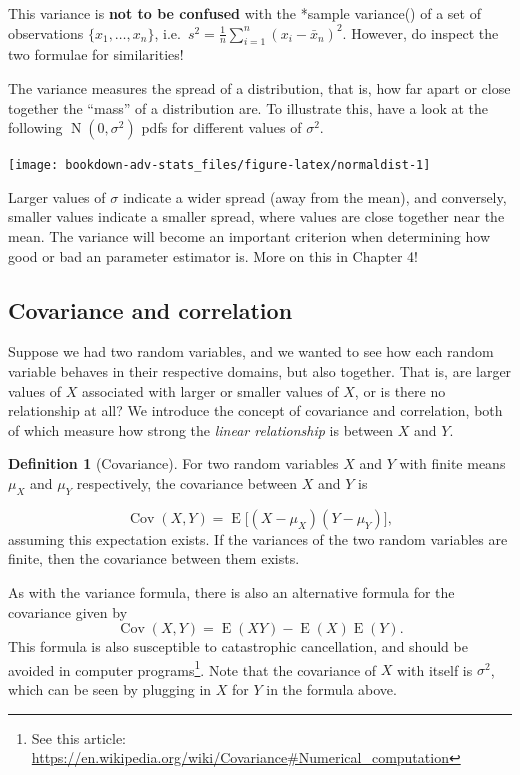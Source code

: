 \documentclass[
]{book}
\DeclareMathOperator{\E}{E}
\DeclareMathOperator{\Cov}{Cov}
\DeclareMathOperator{\N}{N}
\theoremstyle{definition}
\newtheorem{definition}{Definition}[chapter]
\theoremstyle{definition}
\theoremstyle{definition}
\theoremstyle{definition}
\theoremstyle{remark}
\begin{document}
This variance is \textbf{not to be confused} with the *sample variance() of a set of observations \(\{x_1,\dots,x_n\}\), i.e.~\(s^2 = \frac{1}{n}\sum_{i=1}^n (x_i-\bar x_n)^2\). However, do inspect the two formulae for similarities!

The variance measures the spread of a distribution, that is, how far apart or close together the ``mass'' of a distribution are.
To illustrate this, have a look at the following \(\N(0,\sigma^2)\) pdfs for different values of \(\sigma^2\).

\begin{center}\texttt{[image: bookdown-adv-stats\_files/figure-latex/normaldist-1]} \end{center}

Larger values of \(\sigma\) indicate a wider spread (away from the mean), and conversely, smaller values indicate a smaller spread, where values are close together near the mean.
The variance will become an important criterion when determining how good or bad an parameter estimator is.
More on this in Chapter 4!

\hypertarget{covariance-and-correlation}{%
\subsection{Covariance and correlation}\label{covariance-and-correlation}}

Suppose we had two random variables, and we wanted to see how each random variable behaves in their respective domains, but also together.
That is, are larger values of \(X\) associated with larger or smaller values of \(X\), or is there no relationship at all?
We introduce the concept of covariance and correlation, both of which measure how strong the \emph{linear relationship} is between \(X\) and \(Y\).

\begin{definition}[Covariance]
For two random variables \(X\) and \(Y\) with finite means \(\mu_X\) and \(\mu_Y\) respectively, the covariance between \(X\) and \(Y\) is

\[
\Cov(X,Y) = \E\big[(X-\mu_X)(Y-\mu_Y) \big],
\]
assuming this expectation exists.
If the variances of the two random variables are finite, then the covariance between them exists.
\end{definition}

As with the variance formula, there is also an alternative formula for the covariance given by \[\Cov(X,Y) = \E(XY) -\E(X)\E(Y).\]
This formula is also susceptible to catastrophic cancellation, and should be avoided in computer programs\footnote{See this article: \url{https://en.wikipedia.org/wiki/Covariance\#Numerical_computation}}.
Note that the covariance of \(X\) with itself is \(\sigma^2\), which can be seen by plugging in \(X\) for \(Y\) in the formula above.
\end{document}

